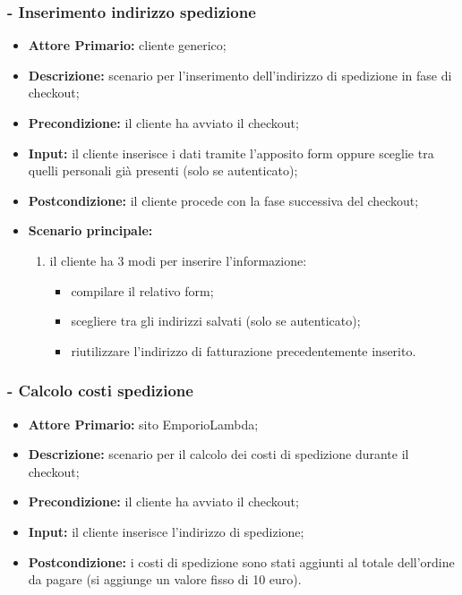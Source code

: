 \subsubsection{ - Inserimento indirizzo spedizione}
\begin{itemize}
    \item \textbf{Attore Primario:} cliente generico;
    \item \textbf{Descrizione:} scenario per l'inserimento dell'indirizzo di spedizione in fase di checkout;
    \item \textbf{Precondizione:} il cliente ha avviato il checkout;
    \item \textbf{Input:} il cliente inserisce i dati tramite l'apposito form oppure sceglie tra quelli personali già presenti (solo se autenticato);
    \item \textbf{Postcondizione:} il cliente procede con la fase successiva del checkout;
    \item \textbf{Scenario principale:}
    \begin{enumerate}
        \item il cliente ha 3 modi per inserire l'informazione:
        \begin{itemize}
            \item compilare il relativo form;
            \item scegliere tra gli indirizzi salvati (solo se autenticato);
            \item riutilizzare l'indirizzo di fatturazione precedentemente inserito.
        \end{itemize}
    \end{enumerate}
\end{itemize}

\stepsubUserCase
\subsubsection{ - Calcolo costi spedizione}
\begin{itemize}
    \item \textbf{Attore Primario:} sito EmporioLambda;
    \item \textbf{Descrizione:} scenario per il calcolo dei costi di spedizione durante il checkout;
    \item \textbf{Precondizione:} il cliente ha avviato il checkout;
    \item \textbf{Input:} il cliente inserisce l'indirizzo di spedizione;
    \item \textbf{Postcondizione:} i costi di spedizione sono stati aggiunti al totale dell'ordine da pagare
                                   (si aggiunge un valore fisso di 10 euro).
\end{itemize}


